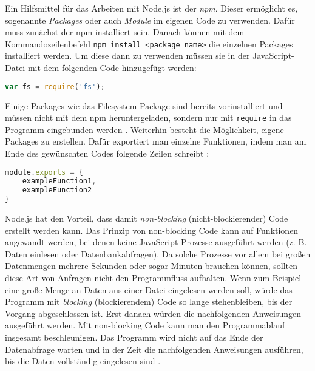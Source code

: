 Ein Hilfsmittel für das Arbeiten mit Node.js ist der \textit{\ac{npm}}. Dieser ermöglicht es, sogenannte \textit{Packages} oder auch \textit{Module} im eigenen Code zu verwenden. Dafür muss zunächst der \ac{npm} installiert sein. Danach können mit dem Kommandozeilenbefehl \texttt{npm install <package name>} die einzelnen Packages installiert werden. Um diese dann zu verwenden müssen sie in der JavaScript-Datei mit dem folgenden Code hinzugefügt werden: \\

\begin{lstlisting}[title=Verwendung des Filesystem-packages (fs) mit dem \texttt{require}-Befehl, language=JavaScript]
var fs = require('fs');
\end{lstlisting}

Einige Packages wie das Filesystem-Package sind bereits vorinstalliert und müssen nicht mit dem \ac{npm} heruntergeladen, sondern nur mit \texttt{require} in das Programm eingebunden werden \cite{npm}.
Weiterhin besteht die Möglichkeit, eigene Packages zu erstellen. Dafür exportiert man einzelne Funktionen, indem man am Ende des gewünschten Codes folgende Zeilen schreibt \cite{npmm}: \\

\begin{lstlisting}[title=Beispiel für den Export von Funktionen, language=JavaScript]
module.exports = {
	exampleFunction1,
	exampleFunction2
}
\end{lstlisting}

Node.js hat den Vorteil, dass damit \textit{non-blocking} (nicht-blockierender) Code erstellt werden kann. Das Prinzip von non-blocking Code kann auf Funktionen angewandt werden, bei denen keine JavaScript-Prozesse ausgeführt werden (z. B. Daten einlesen oder Datenbankabfragen). Da solche Prozesse vor allem bei großen Datenmengen mehrere Sekunden oder sogar Minuten brauchen können, sollten diese Art von Anfragen nicht den Programmfluss aufhalten. Wenn zum Beispiel eine große Menge an Daten aus einer Datei eingelesen werden soll, würde das Programm mit \textit{blocking} (blockierendem) Code so lange stehenbleiben, bis der Vorgang abgeschlossen ist. Erst danach würden die nachfolgenden Anweisungen ausgeführt werden.
Mit non-blocking Code kann man den Programmablauf insgesamt beschleunigen. Das Programm wird nicht auf das Ende der Datenabfrage warten und in der Zeit die nachfolgenden Anweisungen ausführen, bis die Daten vollständig eingelesen sind \cite{njsbloc}. \\

